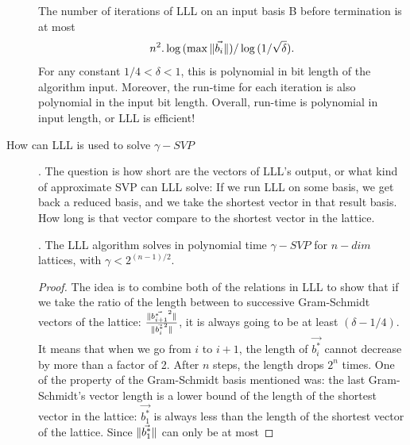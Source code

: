 \begin{description}
            \begin{theorem}
                 The number of iterations of LLL on an input basis
                B before termination is at most
                \[
                    n^2.\log{(\max{\Vert \vec{b_i} \Vert})} / \log{(1/\sqrt{\delta})}.
                \]
                For any constant $1/4 < \delta < 1$, this is polynomial in bit
                length of the algorithm input. Moreover, the run-time for each
                iteration is also polynomial in the input bit length. Overall,
                run-time is polynomial in input length, or LLL is efficient!
                \label{theo:LLLRunTime}
            \end{theorem}

        \item [How can LLL is used to solve $\gamma-SVP$]. The question is how
            short are the vectors of LLL's output, or what kind of approximate
            SVP can LLL solve: If we run LLL on some basis, we get back a
            reduced basis, and we take the shortest vector in that result
            basis. How long is that vector compare to the shortest vector in the
            lattice.
            \begin{theorem}
                . The LLL algorithm solves in polynomial
                time $\gamma-SVP$ for $n-dim$ lattices, with $\gamma <
                2^{(n-1)/2}$.
                \label{theo:LLLShortVector}
            \end{theorem}

            \begin{proof}
                The idea is to combine both of the relations in LLL to show that
                if we take the ratio of the length between to successive
                Gram-Schmidt vectors of the lattice:
                $\frac{\Vert \vec{b_{i+1}^*}^2 \Vert}{\Vert \vec{b_i^*}^2 \Vert}$, it is
                always going to be at least $(\delta - 1/4)$. It means that when
                we go from $i$ to $i+1$, the length of $\vec{b_i^*}$ cannot
                decrease by more than a factor of 2. After $n$ steps, the length
                drops $2^n$ times. One of the property of the Gram-Schmidt basis
                mentioned was: the last Gram-Schmidt's vector length is a lower bound of
                the length of the shortest vector in the lattice:
                $\vec{b_1^*}$ is always less than the length of the shortest
                vector of the lattice. Since $\Vert \vec{b_1^*} \Vert$ can only be at
                most
            \end{proof}


\end{description}

